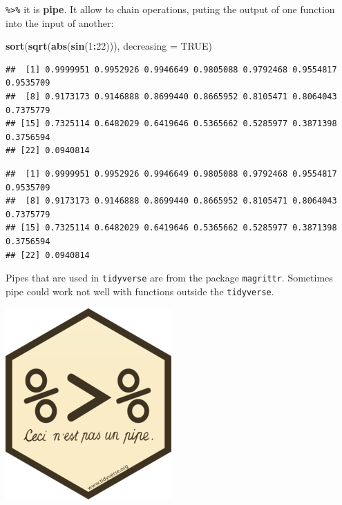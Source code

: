 \documentclass[
]{book}
\newenvironment{Shaded}{\begin{snugshade}}{\end{snugshade}}
\newcommand{\CommentTok}[1]{\textcolor[rgb]{0.56,0.35,0.01}{\textit{#1}}}
\newcommand{\DataTypeTok}[1]{\textcolor[rgb]{0.13,0.29,0.53}{#1}}
\newcommand{\DecValTok}[1]{\textcolor[rgb]{0.00,0.00,0.81}{#1}}
\newcommand{\KeywordTok}[1]{\textcolor[rgb]{0.13,0.29,0.53}{\textbf{#1}}}
\newcommand{\NormalTok}[1]{#1}
\newcommand{\OperatorTok}[1]{\textcolor[rgb]{0.81,0.36,0.00}{\textbf{#1}}}
\newcommand{\OtherTok}[1]{\textcolor[rgb]{0.56,0.35,0.01}{#1}}
\newcommand{\StringTok}[1]{\textcolor[rgb]{0.31,0.60,0.02}{#1}}
\begin{document}
\texttt{\%\textgreater{}\%} it is \textbf{pipe}. It allow to chain operations, puting the output of one function into the input of another:

\begin{Shaded}
\begin{Highlighting}[]
\KeywordTok{sort}\NormalTok{(}\KeywordTok{sqrt}\NormalTok{(}\KeywordTok{abs}\NormalTok{(}\KeywordTok{sin}\NormalTok{(}\DecValTok{1}\OperatorTok{:}\DecValTok{22}\NormalTok{))), }\DataTypeTok{decreasing =} \OtherTok{TRUE}\NormalTok{)}
\end{Highlighting}
\end{Shaded}

\begin{verbatim}
##  [1] 0.9999951 0.9952926 0.9946649 0.9805088 0.9792468 0.9554817 0.9535709
##  [8] 0.9173173 0.9146888 0.8699440 0.8665952 0.8105471 0.8064043 0.7375779
## [15] 0.7325114 0.6482029 0.6419646 0.5365662 0.5285977 0.3871398 0.3756594
## [22] 0.0940814
\end{verbatim}

\begin{Shaded}
\end{Shaded}

\begin{verbatim}
##  [1] 0.9999951 0.9952926 0.9946649 0.9805088 0.9792468 0.9554817 0.9535709
##  [8] 0.9173173 0.9146888 0.8699440 0.8665952 0.8105471 0.8064043 0.7375779
## [15] 0.7325114 0.6482029 0.6419646 0.5365662 0.5285977 0.3871398 0.3756594
## [22] 0.0940814
\end{verbatim}

Pipes that are used in \texttt{tidyverse} are from the package \texttt{magrittr}. Sometimes pipe could work not well with functions outside the \texttt{tidyverse}.

\includegraphics{images/02.02.magrittr.png}
\end{document}
